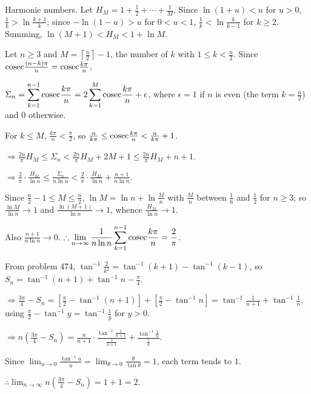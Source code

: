   Harmonic numbers. Let $H_M = 1 + \frac{1}{2} + \cdots + \frac{1}{M}$. Since $\ln(1 + u) < u$ for $u > 0$,
  $\frac{1}{k} > \ln\frac{k + 1}{k}$; since $-\ln(1 - u) > u$ for $0 < u < 1$, $\frac{1}{k} < \ln\frac{k}{k -
    1}$ for $k\geq 2$. Summing, $\ln(M + 1) < H_M < 1 + \ln M$.

  Let $n\geq 3$ and $M = \left\lceil\frac{n}{2}\right\rceil - 1$, the number of $k$ with $1\leq k <
  \frac{n}{2}$. Since ${\rm cosec}\frac{(n - k)\pi}{n} = {\rm cosec}\frac{k\pi}{n}$,

  $\Sigma_n = \displaystyle\sum_{k = 1}^{n - 1}{\rm cosec}\frac{k\pi}{n} = 2\sum_{k = 1}^M{\rm
    cosec}\frac{k\pi}{n} + \epsilon$, where $\epsilon = 1$ if $n$ is even (the term $k = \frac{n}{2}$) and $0$
  otherwise.

  For $k\leq M$, $\frac{k\pi}{n} < \frac{\pi}{2}$, so $\frac{n}{k\pi}\leq{\rm cosec}\frac{k\pi}{n} < \frac{n}{k\pi} +
  1$.

  $\Rightarrow\frac{2n}{\pi}H_M\leq\Sigma_n < \frac{2n}{\pi}H_M + 2M + 1\leq\frac{2n}{\pi}H_M + n + 1$.

  $\Rightarrow\frac{2}{\pi}\cdot\frac{H_M}{\ln n}\leq\frac{\Sigma_n}{n\ln n} < \frac{2}{\pi}\cdot\frac{H_M}{\ln n} +
  \frac{n + 1}{n\ln n}$.

  Since $\frac{n}{2} - 1\leq M\leq\frac{n}{2}$, $\ln M = \ln n + \ln\frac{M}{n}$ with $\frac{M}{n}$ between
  $\frac{1}{6}$ and $\frac{1}{2}$ for $n\geq 3$; so $\frac{\ln M}{\ln n}\to 1$ and $\frac{\ln(M + 1)}{\ln
    n}\to 1$, whence $\frac{H_M}{\ln n}\to 1$.

  Also $\frac{n + 1}{n\ln n}\to 0$. $\therefore\displaystyle\lim_{n\to\infty}\frac{1}{n\ln n}\sum_{k = 1}^{n -
    1}{\rm cosec}\frac{k\pi}{n} = \frac{2}{\pi}$.
\item From problem 474, $\tan^{-1}\frac{2}{k^2} = \tan^{-1}(k + 1) - \tan^{-1}(k - 1)$, so $S_n = \tan^{-1}(n
  + 1) + \tan^{-1}n - \frac{\pi}{4}$.

  $\Rightarrow\frac{3\pi}{4} - S_n = \left[\frac{\pi}{2} - \tan^{-1}(n + 1)\right] + \left[\frac{\pi}{2} -
    \tan^{-1}n\right] = \tan^{-1}\frac{1}{n + 1} + \tan^{-1}\frac{1}{n}$, using $\frac{\pi}{2} - \tan^{-1}y =
  \tan^{-1}\frac{1}{y}$ for $y > 0$.

  $\Rightarrow n\left(\frac{3\pi}{4} - S_n\right) = \frac{n}{n + 1}\cdot\frac{\tan^{-1}\frac{1}{n +
      1}}{\frac{1}{n + 1}} + \frac{\tan^{-1}\frac{1}{n}}{\frac{1}{n}}$.

  Since $\displaystyle\lim_{u\to 0}\frac{\tan^{-1}u}{u} = \lim_{\theta\to 0}\frac{\theta}{\tan\theta} = 1$, each
  term tends to $1$.

  $\therefore\displaystyle\lim_{n\to\infty}n\left(\frac{3\pi}{4} - S_n\right) = 1 + 1 = 2$.
\stopitemize
